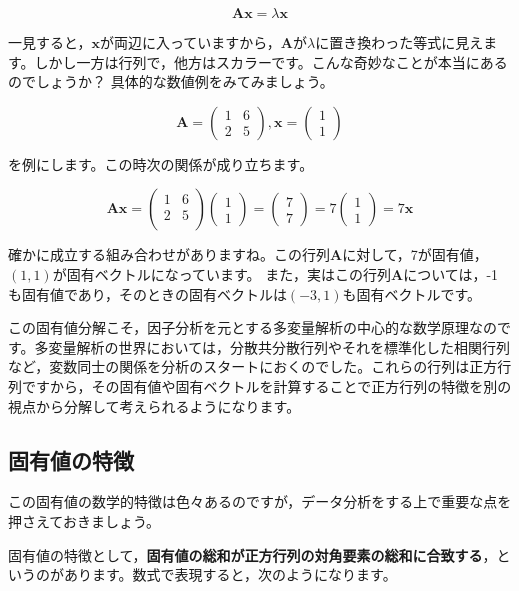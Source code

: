 \documentclass{ltjsbook}
\begin{document}
\[ \bm{Ax} = \lambda\bm{x} \]

一見すると，$\bm{x}$が両辺に入っていますから，$\bm{A}$が$\lambda$に置き換わった等式に見えます。しかし一方は行列で，他方はスカラーです。こんな奇妙なことが本当にあるのでしょうか？
具体的な数値例をみてみましょう。

\[
	\bm{A} = \begin{pmatrix}
		1 & 6 \\ 2 & 5
	\end{pmatrix}
	,\bm{x} = \begin{pmatrix}
		1 \\ 1
	\end{pmatrix}
\]

を例にします。この時次の関係が成り立ちます。

\[
	\bm{Ax} =
	\begin {pmatrix}
	1 & 6 \\
	2 & 5 \\
	\end{pmatrix}
	\begin{pmatrix}
		1 \\ 1
	\end{pmatrix}
	=
	\begin{pmatrix}
		7 \\ 7
	\end{pmatrix}
	=7
	\begin{pmatrix}
		1 \\ 1
	\end{pmatrix}
	=7 \bm{x}
\]

確かに成立する組み合わせがありますね。この行列$\bm{A}$に対して，7が固有値，$(1,1)$が固有ベクトルになっています。
また，実はこの行列$\bm{A}$については，-1も固有値であり，そのときの固有ベクトルは$(-3,1)$も固有ベクトルです。

この固有値分解こそ，因子分析を元とする多変量解析の中心的な数学原理なのです。多変量解析の世界においては，分散共分散行列やそれを標準化した相関行列など，変数同士の関係を分析のスタートにおくのでした。これらの行列は正方行列ですから，その固有値や固有ベクトルを計算することで正方行列の特徴を別の視点から分解して考えられるようになります。

\subsection{固有値の特徴}
この固有値の数学的特徴は色々あるのですが，データ分析をする上で重要な点を押さえておきましょう。

固有値の特徴として，\textbf{固有値の総和が正方行列の対角要素の総和に合致する}，というのがあります。数式で表現すると，次のようになります。
\end{document}
